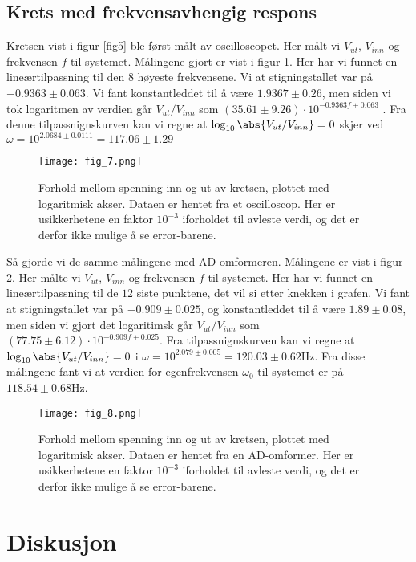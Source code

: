 \documentclass[%
 reprint,
nofootinbib,
aps,
]{revtex4-1}
\begin{document}
\subsection{Krets med frekvensavhengig respons}
Kretsen vist i figur \ref{fig5} ble først målt av oscilloscopet. Her målt vi $V_{ut}$, $V_{inn}$ og frekvensen $f$ til systemet. Målingene gjort er vist i figur \ref{fig7}. Her har vi funnet en lineærtilpassning til den $8$ høyeste frekvensene. Vi at stigningstallet var på $ -0.9363 \pm 0.063$. Vi fant konstantleddet til å være $1.9367 \pm  0.26$, men siden vi tok logaritmen av verdien går $V_{ut}/V_{inn}$ som $(35.61 \pm 9.26) \cdot 10^{-0.9363f \pm 0.063}$ . Fra denne tilpassnignskurven kan vi regne at $\log_{10} \abs{{V_{ut}/V_{inn}}} = 0$
skjer ved $\omega = 10^{2.0684 \pm 0.0111} = 117.06 \pm 1.29$
\begin{figure}[h!]
  \centering
  \texttt{[image: fig\_7.png]}
  \caption{Forhold mellom spenning inn og ut av kretsen, plottet med logaritmisk akser. Dataen er hentet fra et oscilloscop. Her er usikkerhetene en faktor $10^{-3}$ iforholdet til avleste verdi, og det er derfor ikke mulige å se error-barene.}
  \label{fig7}
\end{figure}
Så gjorde vi de samme målingene med AD-omformeren. Målingene er vist i figur \ref{fig8}. Her målte vi $V_{ut}$, $V_{inn}$ og frekvensen $f$ til systemet. Her har vi funnet en lineærtilpassning til de $12$ siste punktene, det vil si etter knekken i grafen. Vi fant at stigningstallet var på $ -0.909 \pm 0.025$, og konstantleddet til å være $1.89 \pm  0.08$, men siden vi gjort det logaritimsk går $V_{ut}/V_{inn}$ som$ (77.75 \pm 6.12) \cdot 10^{-0.909f \pm 0.025}$.
Fra tilpassnignskurven kan vi regne at $\log_{10} \abs{{V_{ut}/V_{inn}}} = 0$ i $\omega = 10^{2.079 \pm 0.005} = 120.03 \pm 0.62$Hz.
Fra disse målingene fant vi at verdien for egenfrekvensen $\omega_0$ til systemet er på $118.54 \pm  0.68$Hz.
\begin{figure}[h!]
  \centering
  \texttt{[image: fig\_8.png]}
  \caption{Forhold mellom spenning inn og ut av kretsen, plottet med logaritmisk akser. Dataen er hentet fra en AD-omformer. Her er usikkerhetene en faktor $10^{-3}$ iforholdet til avleste verdi, og det er derfor ikke mulige å se error-barene.}
  \label{fig8}
\end{figure}
\section{Diskusjon}
\end{document}
